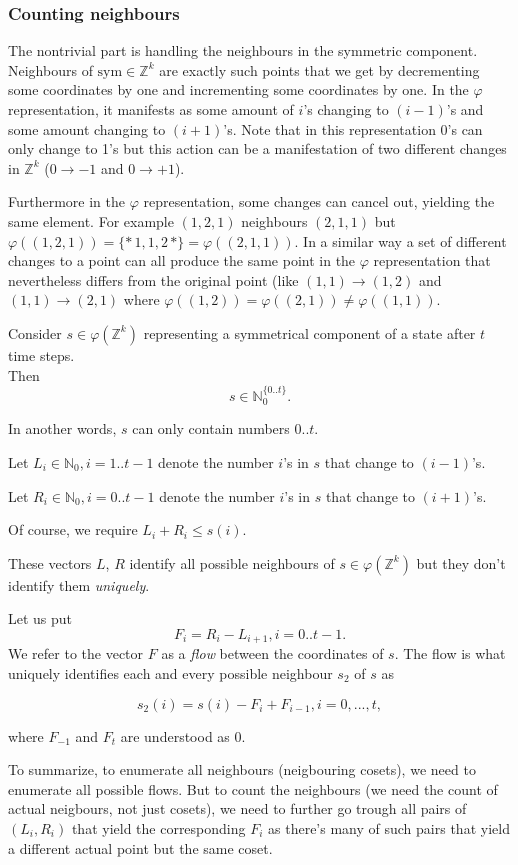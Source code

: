 \documentclass[]{article}
\newcommand{\NN}{\mathbb N}
\newcommand{\ZZ}{\mathbb Z}
\newcommand{\sym}{\mathrm{sym}}
\begin{document}
	\subsubsection{Counting neighbours}
	The nontrivial part is handling the neighbours in the symmetric component.
	Neighbours of $\sym \in \ZZ^k$ are exactly such points that we get by decrementing some coordinates by one and incrementing some coordinates by one. In the $\varphi$ representation, it manifests as some amount of $i$'s changing to $(i-1)$'s and some amount changing to $(i+1)$'s. Note that in this representation 0's can only change to 1's but this action can be a manifestation of two different changes in $\ZZ^k$ ($0 \to -1$ and $0 \to +1$).
	
	Furthermore in the $\varphi$ representation, some changes can cancel out, yielding the same element.
	For example $(1,2,1)$ neighbours $(2,1,1)$ but $\varphi((1,2,1)) = \{*\,1,1,2\,*\} = \varphi((2,1,1))$.
	In a similar way a set of different changes to a point can all produce the same point in the $\varphi$ representation that nevertheless differs from the original point (like $(1,1) \to (1,2)$ and $(1,1) \to (2,1)$ where
	$\varphi((1,2)) = \varphi((2,1)) \ne \varphi((1,1))$.
	
	Consider $s \in \varphi(\ZZ^k)$ representing a symmetrical component of a state after $t$ time steps.\\
	Then
	$$s \in \NN_0^{\{0..t\}}.$$
	
	In another words, $s$ can only contain numbers $0..t$.
	
	Let $L_i \in \NN_0, i=1..t-1$ denote the number $i$'s in $s$ that change to $(i-1)$'s.	
	
	Let $R_i \in \NN_0, i=0..t-1$ denote the number $i$'s in $s$ that change to $(i+1)$'s.
	
	Of course, we require $L_i + R_i \leq s(i)$.
	
	These vectors $L$, $R$ identify all possible neighbours of $s \in \varphi(\ZZ^k)$ but they don't identify them \emph{uniquely}.
	
	Let us put
	$$F_i = R_i - L_{i+1}, i=0..t-1.$$
	We refer to the vector $F$ as a \emph{flow} between the coordinates of $s$.
	The flow is what uniquely identifies each and every possible neighbour $s_2$ of $s$ as
	
	$$s_2(i) = s(i) - F_i + F_{i-1}, i = 0, ..., t,$$
	
	where $F_{-1}$ and $F_t$ are understood as 0.
	
	To summarize, to enumerate all neighbours (neigbouring cosets), we need to enumerate all possible flows. But to count the neighbours (we need the count of actual neigbours, not just cosets), we need to further go trough all pairs of $(L_i, R_i)$ that yield the corresponding $F_i$ as there's many of such pairs that yield a different actual point but the same coset.
	
\end{document}
